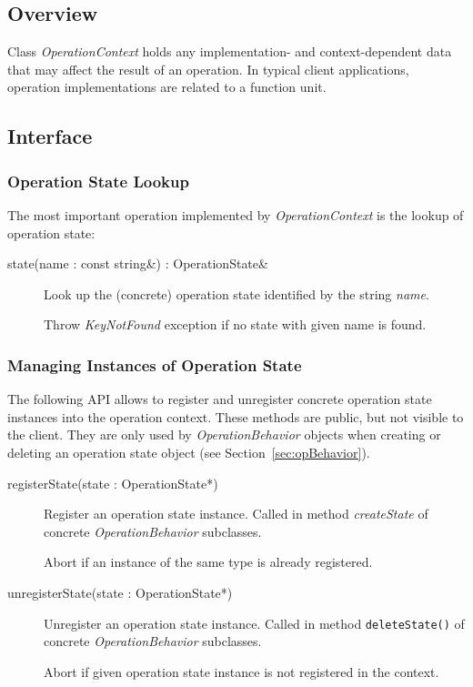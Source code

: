 \documentclass[a4paper,twoside]{tce}
\begin{document}
\subsection{Overview}

Class \emph{OperationContext} holds any implementation- and
context-dependent data that may affect the result of an operation. In
typical client applications, operation implementations are related to a
function unit.

\subsection{Interface}

\subsubsection{Operation State Lookup}

The most important operation implemented by \emph{OperationContext} is the
lookup of operation state:

\begin{description}
\item[state(name : const string\&) : OperationState\&] %
  Look up the (concrete) operation state identified by the string
  \emph{name}.

  Throw \emph{KeyNotFound} exception if no state with given name is found.
\end{description}

\subsubsection{Managing Instances of Operation State}

The following API allows to register and unregister concrete operation state
instances into the operation context.  These methods are public, but not
visible to the client.  They are only used by \emph{OperationBehavior}
objects when creating or deleting an operation state object (see
Section~\ref{sec:opBehavior}).

\begin{description}
\item[registerState(state : OperationState*)] %
  Register an operation state instance. Called in method \emph{createState}
  of concrete \emph{OperationBehavior} subclasses.

  Abort if an instance of the same type is already registered.

\item[unregisterState(state : OperationState*)]%
  Unregister an operation state instance.  Called in method
  \verb|deleteState()| of concrete \emph{OperationBehavior} subclasses.

  Abort if given operation state instance is not registered in the context.
\end{description}
\end{document}
